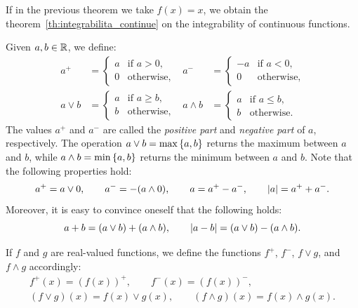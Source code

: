 \begin{remark}
If in the previous theorem we take $f(x)=x$, we obtain 
the theorem~\ref{th:integrabilita_continue} on the integrability of continuous
functions.
\end{remark}

Given $a,b\in {\mathbb R}$, we define:
\begin{align*}
  a^+ &= \begin{cases}
    a & \text{if $a>0$,}\\
    0 & \text{otherwise,}
  \end{cases} &
  a^- &= \begin{cases}
    -a & \text{if $a<0$,}\\
    0 & \text{otherwise,}
  \end{cases} \\
  a \vee b &= \begin{cases}
    a & \text{if $a\ge b$,}\\
    b & \text{otherwise,}
  \end{cases} &
  a \wedge b &= \begin{cases}
    a & \text{if $a\le b$,}\\
    b & \text{otherwise.}
  \end{cases}
\end{align*}
The values $a^+$ and $a^-$ are called the 
\emph{positive part} and \emph{negative part} of $a$, respectively.
The operation $a\vee b = \max{\left\{ a,b \right\}}$ returns the maximum between $a$ and
$b$,
while $a\wedge b = \min{\left\{ a,b \right\}}$ returns the minimum between $a$ and $b$.
Note that the following properties hold:
\[
   a^+ = a \vee 0, \qquad
   a^- = -(a \wedge 0), \qquad
   a = a^+ - a^-, \qquad
   {\left|a\right|} = a^+ + a^-.
\]
Moreover, it is easy to convince oneself that the following holds:
\[
  a + b = (a \vee b) + (a \wedge b), \qquad
  {\left|a-b\right|} = (a \vee b) - (a \wedge b).
\]

If $f$ and $g$ are real-valued functions, we define 
the functions $f^+$, $f^-$, $f\vee g$, and $f\wedge g$ accordingly:
\begin{gather*}
  f^+(x) = (f(x))^+, \qquad
  f^-(x) = (f(x))^-, \\
  (f\vee g)(x) = f(x) \vee g(x), \qquad
  (f\wedge g)(x) = f(x) \wedge g(x).
\end{gather*}

